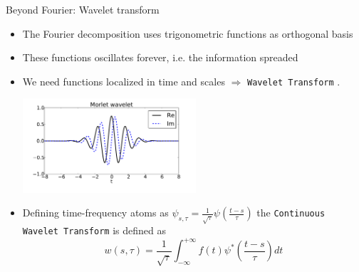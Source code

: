 \documentclass[t,10pt]{beamer}
\begin{document}
\begin{frame}{Beyond Fourier: Wavelet transform}
\begin{itemize}[<+->]
\item {\small  The Fourier decomposition uses trigonometric functions as
  orthogonal basis}
\item {\small  These functions oscillates forever,
  i.e. the information spreaded} 
\item {\small  We need functions localized in time and scales $\Rightarrow$
  \textcolor{tachameleon}{\texttt{Wavelet
      Transform}} {\footnotesize \parencite{Farge:1992un,Mallat:1999te}}.
}
\begin{center}
\includegraphics[height=3.5cm]{morlet}
\end{center}

\item {\small  Defining time-frequency atoms as
  $\psi_{s,\tau}=\frac{1}{\sqrt{\tau}}\psi\left(\frac{t-s}{\tau}\right)$ the
  \textcolor{tachameleon}{\texttt{Continuous Wavelet Transform}} is
  defined as }
\begin{equation*}
w(s,\tau)=\frac{1}{\sqrt{\tau}}\int_{-\infty}^{+\infty}f(t)\psi^{*}\left(\frac{t-s}{\tau}\right)dt
\end{equation*}
\end{itemize}
\end{frame}
\end{document}
